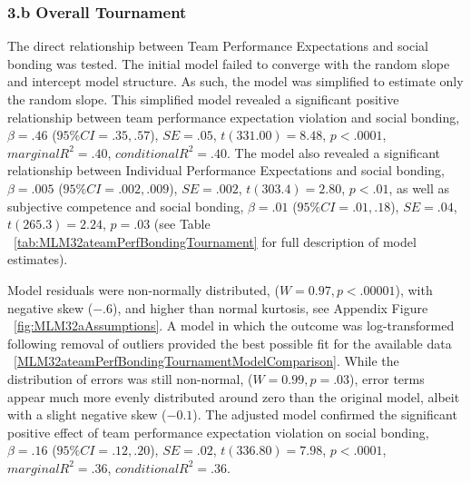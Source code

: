 \begin{landscape}
  
  \restoregeometry





  \subsubsection{3.b Overall Tournament}
  The direct relationship between Team Performance Expectations and social bonding was tested.  The initial model failed to converge with the random slope and intercept model structure.  As such, the model was simplified to estimate only the random slope. This simplified model revealed a significant positive relationship between team performance expectation violation and social bonding, $\beta = .46$ ($95\% CI =  .35, .57$), $SE = .05$, $t(331.00) = 8.48$, $p < .0001$, $marginal R^2 = .40$, $conditional R^2 = .40$.
  The model also revealed a significant relationship between Individual Performance Expectations and social bonding, $\beta = .005$ ($95\% CI =  .002, .009$), $SE = .002$, $t(303.4) = 2.80$, $p < .01$, as well as subjective competence and social bonding, $\beta = .01$ ($95\% CI =  .01, .18$), $SE = .04$, $t(265.3) = 2.24$, $p = .03$ (see Table ~\ref{tab:MLM32ateamPerfBondingTournament} for full description of model estimates).

  Model residuals were non-normally distributed, ($W = 0.97, p < .00001$), with negative skew ($-.6$), and higher than normal kurtosis, see Appendix Figure ~\ref{fig:MLM32aAssumptions}.  A model in which the outcome was log-transformed following removal of outliers provided the best possible fit for the available data ~\ref{MLM32ateamPerfBondingTournamentModelComparison}. While the distribution of errors was still non-normal, ($W = 0.99, p = .03$),  error terms appear much more evenly distributed around zero than the original model, albeit with a slight negative skew ($-0.1$).
  The adjusted model confirmed the significant positive effect of team performance expectation violation on social bonding,  $\beta = .16$ ($95\% CI =  .12, .20$), $SE = .02$, $t(336.80) = 7.98$, $p < .0001$, $marginal R^2 = .36$, $conditional R^2 = .36$.

   


\end{landscape}
